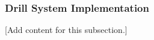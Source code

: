 
\subsubsection{Drill System Implementation}
\label{subsubsec:design_2_1_8_drill_system_implementation}

[Add content for this subsection.]
